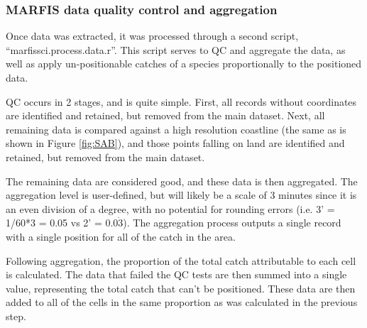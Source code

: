 \documentclass[letterpaper,portrait,11pt]{scrartcl}
\numberwithin{equation}{section}		%
\numberwithin{figure}{section}		%
\numberwithin{table}{section}				%
\begin{document}



\subsubsection{MARFIS data quality control and aggregation}
Once data was extracted, it was processed through a second script, \textquotedblleft marfissci.process.data.r\textquotedblright.  This script serves to QC and aggregate the data, as well as apply un-positionable catches of a species proportionally to the positioned data.

QC occurs in 2 stages, and is quite simple.  First, all records without coordinates are identified and retained, but removed from the main dataset.  Next, all remaining data is compared against a high resolution coastline (the same as is shown in Figure \ref{fig:SAB}), and those points falling on land are identified and retained, but removed from the main dataset.

The remaining data are considered good, and these data is then aggregated.  The aggregation level is user-defined, but will likely be a scale of 3 minutes since it is an even division of a degree, with no potential for rounding errors (i.e. 3' = 1/60*3 = 0.05 vs 2' = $0.0\dot{3}$).  The aggregation process outputs a single record with a single position for all of the catch in the area.

Following aggregation, the proportion of the total catch attributable to each cell is calculated.  The data that failed the QC tests are then summed into a single value, representing the total catch that can\textquoteright t be positioned.  These data are then added to all of the cells in the same proportion as was calculated in the previous step.
\end{document}
